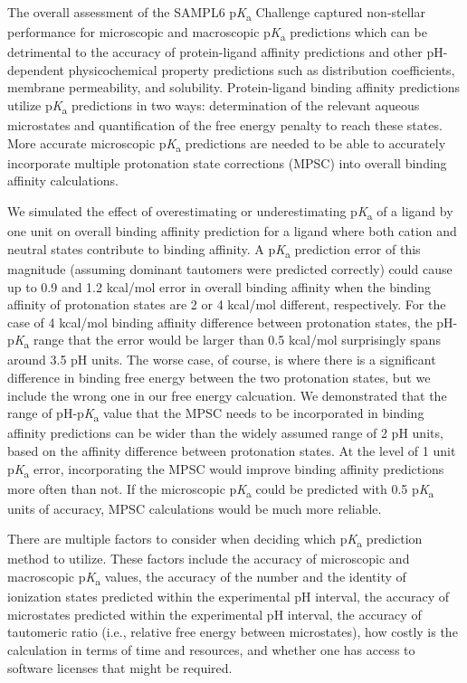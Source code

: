 \documentclass[9pt,lineno,final]{elife}
\newcommand{\pKa}{p\textit{K}\textsubscript{a}}
\begin{document}
The overall assessment of the SAMPL6 \pKa{} Challenge captured non-stellar performance for microscopic and macroscopic \pKa{} predictions which can be detrimental to the accuracy of protein-ligand affinity predictions and other pH-dependent physicochemical property predictions such as distribution coefficients, membrane permeability, and solubility.
Protein-ligand binding affinity predictions utilize \pKa{} predictions in two ways: determination of the relevant aqueous microstates and quantification of the free energy penalty to reach these states. 
More accurate microscopic \pKa{} predictions are needed to be able to accurately incorporate multiple protonation state corrections (MPSC) into overall binding affinity calculations. 

We simulated the effect of overestimating or underestimating \pKa{} of a ligand by one unit on overall binding affinity prediction for a ligand where both cation and neutral states contribute to binding affinity. 
A \pKa{} prediction error of this magnitude (assuming dominant tautomers were predicted correctly) could cause up to 0.9 and 1.2 kcal/mol error in overall binding affinity when the binding affinity of protonation states are 2 or 4 kcal/mol different, respectively. 
For the case of 4 kcal/mol binding affinity difference between protonation states, the pH-\pKa{} range that the error would be larger than 0.5 kcal/mol surprisingly spans around 3.5 pH units. 
The worse case, of course, is where there is a significant difference in binding free energy between the two protonation states, but we include the wrong one in our free energy calcuation.
We demonstrated that the range of pH-\pKa{} value that the MPSC needs to be incorporated in binding affinity predictions can be wider than the widely assumed range of 2 pH units, based on the affinity difference between protonation states. 
At the level of 1 unit \pKa{} error, incorporating the MPSC would improve binding affinity predictions more often than not. 
If the microscopic \pKa{} could be predicted with 0.5 \pKa{} units of accuracy, MPSC calculations would be much more reliable.

There are multiple factors to consider when deciding which \pKa{} prediction method to utilize. 
These factors include the accuracy of microscopic and macroscopic \pKa{} values, the accuracy of the number and the identity of ionization states predicted within the experimental pH interval, the accuracy of microstates predicted within the experimental pH interval, the accuracy of tautomeric ratio (i.e., relative free energy between microstates), how costly is the calculation in terms of time and resources, and whether one has access to software licenses that might be required. 
\end{document}
